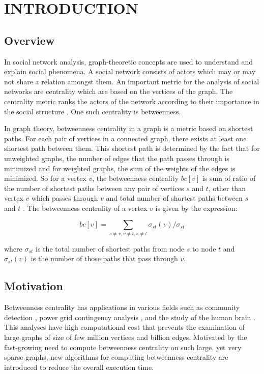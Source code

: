 \chapter{INTRODUCTION}
\label{chap:intro}
\section{Overview}

In social network analysis, graph-theoretic concepts are used to understand and explain social phenomena. A social network consists of actors which may or may not share a relation amongst them. An important metric for the analysis of social networks are centrality which are based on the vertices of the graph. The centrality metric ranks the actors of the network according to their importance in the social structure \cite{doi:10.1080/0022250X.2001.9990249}. One such centrality is betweenness.

In graph theory, betweenness centrality in a graph is a metric based on shortest paths. For each pair of vertices in a connected graph, there exists at least one shortest path between them. This shortest path is determined by the fact that for unweighted graphs, the number of edges that the path passes through is minimized and for weighted graphs, the sum of the weights of the edges is minimized. So for a vertex $v$, the betweenness centrality $bc[v]$ is sum of ratio of the number of shortest paths between any pair of vertices $s$ and $t$, other than vertex $v$ which passes through $v$ and total number of shortest paths between $s$ and $t$ \cite{10.2307/3033543}.
The betweenness centrality of a vertex $v$ is given by the expression:

\begin{equation} \label{eqstart}
bc[v] = \sum_{s\neq v,v \neq t,s\neq t} \sigma_{st}(v) / \sigma_{st}
\end{equation}

where $\sigma_{st}$ is the total number of shortest paths from node $s$ to node $t$ and $\sigma_{st}(v)$ is the number of those paths that pass through $v$.

\vspace{-1.0em}
\section{Motivation}
\vspace{-1.0em}
Betweenness centrality has applications in various fields such as community detection \cite{6012870}, power grid contingency analysis \cite{5470400}, and the study of the human brain \cite{articlebrain}. This analyses have high computational cost that prevents the examination of large graphs of size of few million vertices and billion edges. Motivated by the fast-growing need to compute betweenness centrality on such large, yet very sparse graphs, new algorithms for computing betweenness centrality are introduced to reduce the overall execution time. 

